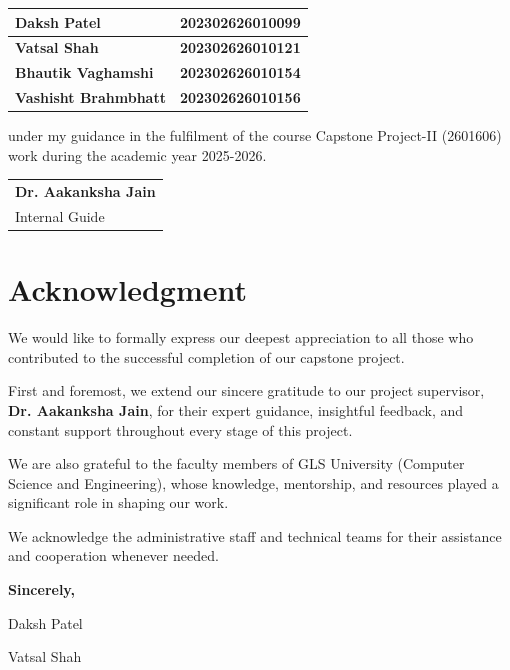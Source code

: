 \documentclass[12pt,a4paper]{report}
\begin{document}
\begin{center}
\begin{tabular}{|>{\raggedright\arraybackslash}p{}|>{\centering\arraybackslash}p{}|}
    \hline
    \textbf{Daksh Patel} & \textbf{202302626010099} \\ \hline
    \textbf{Vatsal Shah} & \textbf{202302626010121} \\ \hline
    \textbf{Bhautik Vaghamshi} & \textbf{202302626010154} \\ \hline
    \textbf{Vashisht Brahmbhatt} & \textbf{202302626010156} \\ \hline
\end{tabular}
\end{center}

under my guidance in the fulfilment of the course Capstone Project-II (2601606) work during the academic year 2025-2026.

\begin{center}
\begin{tabular}{|p{}|}
\hline
\centering \textbf{Dr. Aakanksha Jain}\\
\centering Internal Guide\\
\hline
\end{tabular}
\end{center}

\chapter*{Acknowledgment}
We would like to formally express our deepest appreciation to all those who contributed to the successful completion of our capstone project.

First and foremost, we extend our sincere gratitude to our project supervisor, \textbf{Dr. Aakanksha Jain}, for their expert guidance, insightful feedback, and constant support throughout every stage of this project.

We are also grateful to the faculty members of GLS University (Computer Science and Engineering), whose knowledge, mentorship, and resources played a significant role in shaping our work.

We acknowledge the administrative staff and technical teams for their assistance and cooperation whenever needed.

\textbf{Sincerely,}

Daksh Patel

Vatsal Shah
\end{document}
